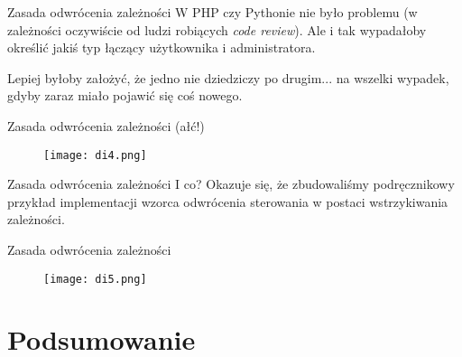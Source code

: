 \begin{frame}{Zasada odwrócenia zależności}
	W PHP czy Pythonie nie było problemu (w zależności oczywiście od ludzi robiących \emph{code review}). Ale i tak wypadałoby określić jakiś typ łączący użytkownika i administratora.
	
	Lepiej byłoby założyć, że jedno nie dziedziczy po drugim... na wszelki wypadek, gdyby zaraz miało pojawić się coś nowego.
\end{frame}

\begin{frame}{Zasada odwrócenia zależności (ałć!)}
	\begin{figure} \centering
		\texttt{[image: di4.png]}
	\end{figure}
\end{frame}

\begin{frame}{Zasada odwrócenia zależności}
	I co? Okazuje się, że zbudowaliśmy podręcznikowy przykład implementacji wzorca odwrócenia sterowania w postaci wstrzykiwania zależności.
\end{frame}

\begin{frame}{Zasada odwrócenia zależności}
	\begin{figure} \centering
		\texttt{[image: di5.png]}
	\end{figure}
\end{frame}

\section{Podsumowanie}

